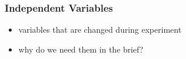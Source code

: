 \subsubsection{Independent Variables}

\begin{itemize}
	\item variables that are changed during experiment
	\item why do we need them in the brief?
\end{itemize}